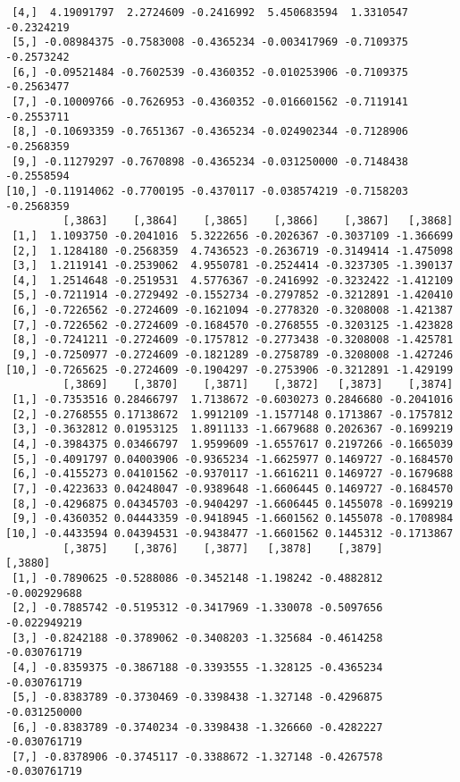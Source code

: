 \documentclass[
  letterpaper,
  DIV=11,
  numbers=noendperiod]{scrreprt}
\begin{document}
\begin{verbatim}
 [4,]  4.19091797  2.2724609 -0.2416992  5.450683594  1.3310547 -0.2324219
 [5,] -0.08984375 -0.7583008 -0.4365234 -0.003417969 -0.7109375 -0.2573242
 [6,] -0.09521484 -0.7602539 -0.4360352 -0.010253906 -0.7109375 -0.2563477
 [7,] -0.10009766 -0.7626953 -0.4360352 -0.016601562 -0.7119141 -0.2553711
 [8,] -0.10693359 -0.7651367 -0.4365234 -0.024902344 -0.7128906 -0.2568359
 [9,] -0.11279297 -0.7670898 -0.4365234 -0.031250000 -0.7148438 -0.2558594
[10,] -0.11914062 -0.7700195 -0.4370117 -0.038574219 -0.7158203 -0.2568359
         [,3863]    [,3864]    [,3865]    [,3866]    [,3867]   [,3868]
 [1,]  1.1093750 -0.2041016  5.3222656 -0.2026367 -0.3037109 -1.366699
 [2,]  1.1284180 -0.2568359  4.7436523 -0.2636719 -0.3149414 -1.475098
 [3,]  1.2119141 -0.2539062  4.9550781 -0.2524414 -0.3237305 -1.390137
 [4,]  1.2514648 -0.2519531  4.5776367 -0.2416992 -0.3232422 -1.412109
 [5,] -0.7211914 -0.2729492 -0.1552734 -0.2797852 -0.3212891 -1.420410
 [6,] -0.7226562 -0.2724609 -0.1621094 -0.2778320 -0.3208008 -1.421387
 [7,] -0.7226562 -0.2724609 -0.1684570 -0.2768555 -0.3203125 -1.423828
 [8,] -0.7241211 -0.2724609 -0.1757812 -0.2773438 -0.3208008 -1.425781
 [9,] -0.7250977 -0.2724609 -0.1821289 -0.2758789 -0.3208008 -1.427246
[10,] -0.7265625 -0.2724609 -0.1904297 -0.2753906 -0.3212891 -1.429199
         [,3869]    [,3870]    [,3871]    [,3872]   [,3873]    [,3874]
 [1,] -0.7353516 0.28466797  1.7138672 -0.6030273 0.2846680 -0.2041016
 [2,] -0.2768555 0.17138672  1.9912109 -1.1577148 0.1713867 -0.1757812
 [3,] -0.3632812 0.01953125  1.8911133 -1.6679688 0.2026367 -0.1699219
 [4,] -0.3984375 0.03466797  1.9599609 -1.6557617 0.2197266 -0.1665039
 [5,] -0.4091797 0.04003906 -0.9365234 -1.6625977 0.1469727 -0.1684570
 [6,] -0.4155273 0.04101562 -0.9370117 -1.6616211 0.1469727 -0.1679688
 [7,] -0.4223633 0.04248047 -0.9389648 -1.6606445 0.1469727 -0.1684570
 [8,] -0.4296875 0.04345703 -0.9404297 -1.6606445 0.1455078 -0.1699219
 [9,] -0.4360352 0.04443359 -0.9418945 -1.6601562 0.1455078 -0.1708984
[10,] -0.4433594 0.04394531 -0.9438477 -1.6601562 0.1445312 -0.1713867
         [,3875]    [,3876]    [,3877]   [,3878]    [,3879]      [,3880]
 [1,] -0.7890625 -0.5288086 -0.3452148 -1.198242 -0.4882812 -0.002929688
 [2,] -0.7885742 -0.5195312 -0.3417969 -1.330078 -0.5097656 -0.022949219
 [3,] -0.8242188 -0.3789062 -0.3408203 -1.325684 -0.4614258 -0.030761719
 [4,] -0.8359375 -0.3867188 -0.3393555 -1.328125 -0.4365234 -0.030761719
 [5,] -0.8383789 -0.3730469 -0.3398438 -1.327148 -0.4296875 -0.031250000
 [6,] -0.8383789 -0.3740234 -0.3398438 -1.326660 -0.4282227 -0.030761719
 [7,] -0.8378906 -0.3745117 -0.3388672 -1.327148 -0.4267578 -0.030761719

\end{verbatim}
\end{document}
